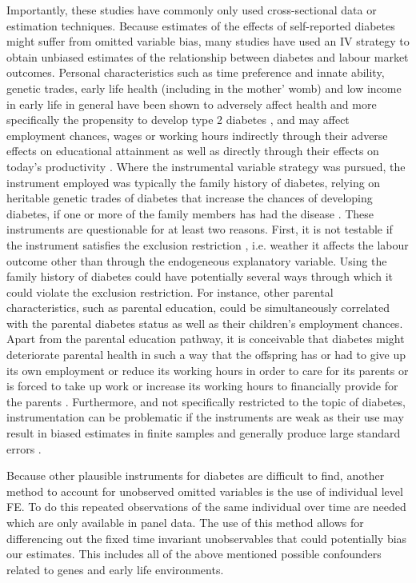 Importantly, these studies have commonly only used cross-sectional
data or estimation techniques. Because estimates of the effects of self-reported diabetes might
suffer from omitted variable bias, many studies have used an \ac{IV}
strategy to obtain unbiased estimates of the relationship between
diabetes and labour market outcomes. Personal characteristics such
as time preference and innate ability, genetic trades, early life
health (including in the mother' womb) and low income in early life
in general have been shown to adversely affect health and more specifically
the propensity to develop type 2 diabetes \citep{VanEwijk2011a,Sotomayor2013,Li2010b},
and may affect employment chances, wages or working hours indirectly
through their adverse effects on educational attainment \citep{Ayyagari2011b}
as well as directly through their effects on today's productivity
\citep{Currie2013}. Where the instrumental variable strategy was
pursued, the instrument employed was typically the family history
of diabetes, relying on heritable genetic trades of diabetes that
increase the chances of developing diabetes, if one or more of the family members
has had the disease \citep{Brown2005,Latif2009,Minor2010a,Lin2011b,Seuring2015}.
These instruments are questionable for at least two reasons. First,
it is not testable if the instrument satisfies the exclusion restriction
 , i.e. weather it affects the labour outcome other than through
the endogeneous explanatory variable. Using the family history of diabetes could have potentially several ways through which it could violate the exclusion restriction. For instance, other parental characteristics, such as parental education, could be simultaneously correlated with the parental diabetes status as well as their children’s
employment chances. Apart from the parental education pathway, it is conceivable that diabetes might deteriorate parental health in such a way that the offspring has or had to give
up its own employment or reduce its working hours in order to care for its parents or is forced to take up work or increase its working hours to financially provide for the parents \citet{Seuring2015}. Furthermore, and not specifically restricted to the topic of diabetes, instrumentation can be problematic if the instruments are weak as their use may result in biased estimates in finite samples and generally produce large standard errors \citep{Bound1995}. 

Because other plausible instruments for diabetes are difficult to
find, another method to account for unobserved omitted variables is
the use of individual level \ac{FE}. To do this repeated observations
of the same individual over time are needed which are only available
in panel data. The use of this method allows for differencing out
the fixed time invariant unobservables that could potentially bias
our estimates. This includes all of the above mentioned possible confounders
related to genes and early life environments.

